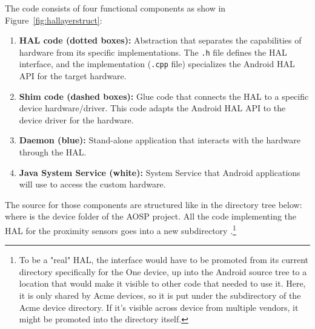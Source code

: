 The code consists of four functional components as show in Figure~\ref{fig:hallayerstruct}:
\begin{enumerate}
    \item \textbf{HAL code (dotted boxes):} Abstraction that separates the capabilities of hardware from its specific implementations. The \texttt{.h} file defines the HAL interface, and the implementation (\texttt{.cpp} file) specializes the Android HAL API for the target hardware. 
    \item \textbf{Shim code (dashed boxes):} Glue code that connects the HAL to a specific device hardware/driver. This code adapts the Android HAL API to the device driver for the hardware.
    \item \textbf{Daemon (blue):} Stand-alone application that interacts with the hardware through the HAL.
    \item \textbf{Java System Service (white):} System Service that Android applications will use to access the custom hardware.
\end{enumerate}

The source for those components are structured like in the directory tree below:
where  is the device folder of the AOSP project.  All the code implementing the HAL for the proximity sensors goes into a new subdirectory .\footnote{To be a "real" HAL, the interface  would have to be promoted from its current directory specifically for the One device, up into the Android source tree to a location that would make it visible to other code that needed to use it. Here, it is only shared by Acme devices, so it is put under the subdirectory of the Acme device directory. If it's visible across device from multiple vendors, it might be promoted into the  directory itself.}

